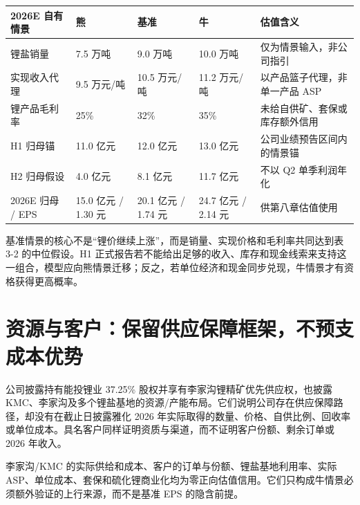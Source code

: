 \begin{exhibitbox}[表 3-2：锂盐情景与合并盈利桥]
\begin{tabularx}{\exhibitboxwidth}{L{3.0cm}R{2.2cm}R{2.2cm}R{2.2cm}X}
\toprule
2026E 自有情景 & 熊 & 基准 & 牛 & 估值含义 \\
\midrule
锂盐销量 & 7.5 万吨 & 9.0 万吨 & 10.0 万吨 & 仅为情景输入，非公司指引 \\
实现收入代理 & 9.5 万元/吨 & 10.5 万元/吨 & 11.2 万元/吨 & 以产品篮子代理，非单一产品 ASP \\
锂产品毛利率 & 25\% & 32\% & 35\% & 未给自供矿、套保或库存额外信用 \\
H1 归母锚 & 11.0 亿元 & 12.0 亿元 & 13.0 亿元 & 公司业绩预告区间内的情景锚 \\
H2 归母假设 & 4.0 亿元 & 8.1 亿元 & 11.7 亿元 & 不以 Q2 单季利润年化 \\
2026E 归母 / EPS & 15.0 亿元 / 1.30 元 & 20.1 亿元 / 1.74 元 & 24.7 亿元 / 2.14 元 & 供第八章估值使用 \\
\bottomrule
\end{tabularx}
\end{exhibitbox}

基准情景的核心不是“锂价继续上涨”，而是销量、实现价格和毛利率共同达到表 3-2 的中位假设。H1 正式报告若不能给出足够的收入、库存和现金线索来支持这一组合，模型应向熊情景迁移；反之，若单位经济和现金同步兑现，牛情景才有资格获得更高概率。

\section{资源与客户：保留供应保障框架，不预支成本优势}

公司披露持有能投锂业 37.25\% 股权并享有李家沟锂精矿优先供应权，也披露 KMC、李家沟及多个锂盐基地的资源/产能布局。它们说明公司存在供应保障路径，却没有在截止日披露雅化 2026 年实际取得的数量、价格、自供比例、回收率或单位成本。具名客户同样证明资质与渠道，而不证明客户份额、剩余订单或 2026 年收入。

\begin{sourcequalitybox}[估值处理]
李家沟/KMC 的实际供给和成本、客户的订单与份额、锂盐基地利用率、实际 ASP、单位成本、套保和硫化锂商业化均为零正向估值信用。它们只构成牛情景必须额外验证的上行来源，而不是基准 EPS 的隐含前提。
\end{sourcequalitybox}
